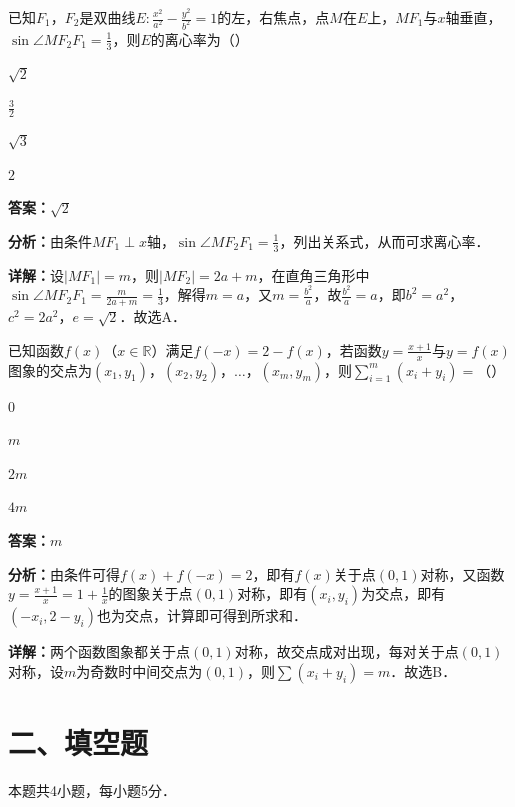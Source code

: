 \begin{question}[points=5]
已知$F_1$，$F_2$是双曲线$E:\frac{x^2}{a^2}-\frac{y^2}{b^2}=1$的左，右焦点，点$M$在$E$上，$MF_1$与$x$轴垂直，$\sin\angle MF_2F_1=\frac{1}{3}$，则$E$的离心率为（\quad）
\begin{choices}
  \item $\sqrt{2}$
  \item $\frac{3}{2}$
  \item $\sqrt{3}$
  \item $2$
\end{choices}
\begin{solution}
\textbf{答案：}$\sqrt{2}$

\textbf{分析：}由条件$MF_1\perp x$轴，$\sin\angle MF_2F_1=\frac13$，列出关系式，从而可求离心率．

\textbf{详解：}设$|MF_1|=m$，则$|MF_2|=2a+m$，在直角三角形中$\sin\angle MF_2F_1=\frac{m}{2a+m}=\frac13$，解得$m=a$，又$m=\frac{b^2}{a}$，故$\frac{b^2}{a}=a$，即$b^2=a^2$，$c^2=2a^2$，$e=\sqrt{2}$．故选A．
\end{solution}
\end{question}

\begin{question}[points=5]
已知函数$f(x)$（$x\in\mathbb{R}$）满足$f(-x)=2-f(x)$，若函数$y=\frac{x+1}{x}$与$y=f(x)$图象的交点为$(x_1,y_1)$，$(x_2,y_2)$，$\ldots$，$(x_m,y_m)$，则$\sum_{i=1}^{m}(x_i+y_i)=$（\quad）
\begin{choices}
  \item $0$
  \item $m$
  \item $2m$
  \item $4m$
\end{choices}
\begin{solution}
\textbf{答案：}$m$

\textbf{分析：}由条件可得$f(x)+f(-x)=2$，即有$f(x)$关于点$(0,1)$对称，又函数$y=\frac{x+1}{x}=1+\frac{1}{x}$的图象关于点$(0,1)$对称，即有$(x_i,y_i)$为交点，即有$(-x_i,2-y_i)$也为交点，计算即可得到所求和．

\textbf{详解：}两个函数图象都关于点$(0,1)$对称，故交点成对出现，每对关于点$(0,1)$对称，设$m$为奇数时中间交点为$(0,1)$，则$\sum (x_i+y_i)=m$．故选B．
\end{solution}
\end{question}

\section*{二、填空题}
本题共4小题，每小题5分．

